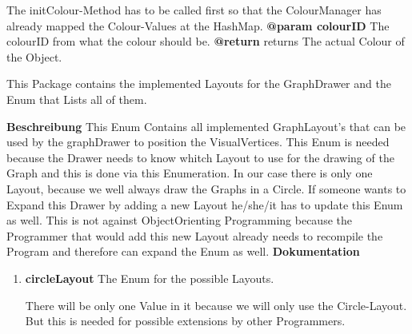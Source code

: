 \begin{enumerate}[+]
{						The initColour-Method has to be called first so that the ColourManager has already mapped the Colour-Values at the HashMap.
						\newline
						\textbf{@param colourID}
							The colourID from what the colour should be.
							\newline
						\textbf{@return} returns
							The actual Colour of the Object.
							\newline
					}
				\end{enumerate}
	
		This Package contains the implemented Layouts for the GraphDrawer and the Enum that Lists all of them.
		
				\textbf{Beschreibung}\newline
				This Enum Contains all implemented GraphLayout's that can be used by the graphDrawer to position the VisualVertices.				
				This Enum is needed because the Drawer needs to know whitch Layout to use for the drawing of the Graph and this is done via this Enumeration.				
				In our case there is only one Layout, because we well always draw the Graphs in a Circle.				
				If someone wants to Expand this Drawer by adding a new Layout he/she/it has to update this Enum as well.
				This is not against ObjectOrienting Programming because the Programmer that would add this new Layout already needs to recompile the Program and therefore can expand the Enum as well.
				\textbf{Dokumentation}\newline
				\begin{enumerate}[+]
					\item{
						\textbf{circleLayout} \newline
						The Enum for the possible Layouts.
						
						There will be only one Value in it because we will only use the Circle-Layout.
						But this is needed for possible extensions by other Programmers.
					}
				\end{enumerate}
				
